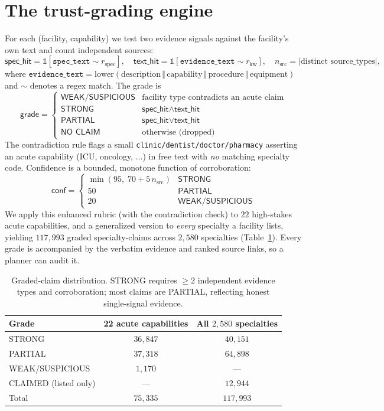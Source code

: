 \documentclass[11pt]{article}
\begin{document}
\section{The trust-grading engine}\label{sec:trust}
For each (facility, capability) we test two evidence signals against the facility's own text and count independent sources:
\[
\textsf{spec\_hit}=\mathbb{1}[\texttt{spec\_text} \sim r_{\text{spec}}],\quad
\textsf{text\_hit}=\mathbb{1}[\texttt{evidence\_text} \sim r_{\text{kw}}],\quad
n_{\text{src}}=|\text{distinct source\_types}|,
\]
where $\texttt{evidence\_text}=\text{lower}(\text{description}\,\Vert\,\text{capability}\,\Vert\,\text{procedure}\,\Vert\,\text{equipment})$ and $\sim$ denotes a regex match. The grade is
\[
\textsf{grade}=
\begin{cases}
\textsf{WEAK/SUSPICIOUS} & \text{facility type contradicts an acute claim}\\
\textsf{STRONG} & \textsf{spec\_hit}\wedge\textsf{text\_hit}\\
\textsf{PARTIAL} & \textsf{spec\_hit}\vee\textsf{text\_hit}\\
\textsf{NO CLAIM} & \text{otherwise (dropped)}
\end{cases}
\]
The contradiction rule flags a small \texttt{clinic/dentist/doctor/pharmacy} asserting an acute capability (ICU, oncology, $\dots$) in free text with \emph{no} matching specialty code. Confidence is a bounded, monotone function of corroboration:
\[
\textsf{conf}=
\begin{cases}
\min(95,\;70+5\,n_{\text{src}}) & \textsf{STRONG}\\
50 & \textsf{PARTIAL}\\
20 & \textsf{WEAK/SUSPICIOUS}
\end{cases}
\]
We apply this enhanced rubric (with the contradiction check) to $22$ high-stakes acute capabilities, and a generalized version to \emph{every} specialty a facility lists, yielding $117{,}993$ graded specialty-claims across $2{,}580$ specialties (Table~\ref{tab:grades}). Every grade is accompanied by the verbatim evidence and ranked source links, so a planner can audit it.

\begin{table}[H]\centering\small
\begin{tabular}{lcc}
\toprule
Grade & 22 acute capabilities & All $2{,}580$ specialties\\
\midrule
STRONG & $36{,}847$ & $40{,}151$\\
PARTIAL & $37{,}318$ & $64{,}898$\\
WEAK/SUSPICIOUS & $1{,}170$ & ---\\
CLAIMED (listed only) & --- & $12{,}944$\\
\midrule
Total & $75{,}335$ & $117{,}993$\\
\bottomrule
\end{tabular}
\caption{Graded-claim distribution. STRONG requires $\geq2$ independent evidence types and corroboration; most claims are PARTIAL, reflecting honest single-signal evidence.}
\label{tab:grades}
\end{table}
\end{document}

